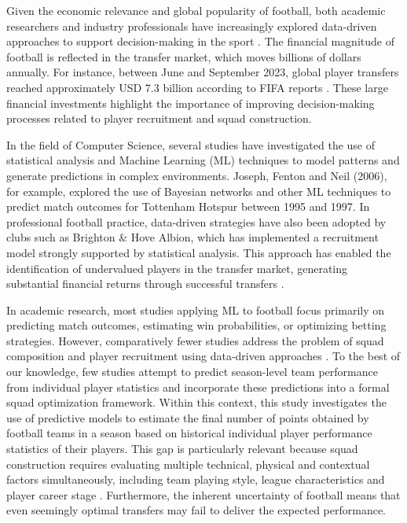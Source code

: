 \documentclass[12pt]{article}
\begin{document}
Given the economic relevance and global popularity of football, both academic researchers and industry professionals have increasingly explored 
data-driven approaches to support decision-making in the sport \cite{Baboota2019}. The financial magnitude of football is reflected in the transfer market, 
which moves billions of dollars annually. For instance, between June and September 2023, global player transfers reached approximately USD 7.3 billion according 
to FIFA reports \cite{Globo2023}. These large financial investments highlight the importance of improving decision-making processes related to player 
recruitment and squad construction.

In the field of Computer Science, several studies have investigated the use of statistical analysis and Machine Learning (ML) techniques to model 
patterns and generate predictions in complex environments. Joseph, Fenton and Neil (2006), for example, explored the use of Bayesian networks and other 
ML techniques to predict match outcomes for Tottenham Hotspur between 1995 and 1997. In professional football practice, data-driven strategies have also been 
adopted by clubs such as Brighton \& Hove Albion, which has implemented a recruitment model strongly supported by statistical analysis. 
This approach has enabled the identification of undervalued players in the transfer market, generating substantial financial returns through successful transfers 
\cite{BBC2023Caicedo, CNN2023Caicedo, ESPN2023}.

In academic research, most studies applying ML to football focus primarily on predicting match outcomes, estimating win probabilities, or optimizing 
betting strategies. However, comparatively fewer studies address the problem of squad composition and player recruitment using data-driven approaches \cite{Abidin2021}.
To the best of our knowledge, few studies attempt to predict season-level team performance from individual player statistics and 
incorporate these predictions into a formal squad optimization framework. Within this context, this study investigates the use of predictive models to estimate 
the final number of points obtained by football teams in a season based on historical individual player performance statistics of their players.
This gap is particularly relevant because squad construction requires evaluating multiple technical, physical and contextual factors simultaneously, 
including team playing style, league characteristics and player career stage \cite{Abidin2021}. Furthermore, the inherent uncertainty of football means 
that even seemingly optimal transfers may fail to deliver the expected performance.
\end{document}
